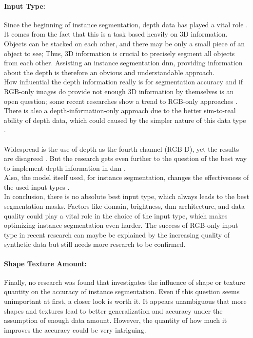 		\paragraph{Input Type:} Since the beginning of instance segmentation, depth data has played a vital role \cite{Silbermann2012}. It comes from the fact that this is a task based heavily on 3D information. Objects can be stacked on each other, and there may be only a small piece of an object to see;
		Thus, 3D information is crucial to precisely segment all objects from each other. Assisting an instance segmentation \ac{dnn}, providing information about the depth is therefore an obvious and understandable approach.\\
		How influential the depth information really is for segmentation accuracy and if RGB-only images do provide not enough 3D information by themselves is an open question; some recent researches show a trend to RGB-only approaches \cite{Raj2023}\cite{Zakeri2024}.\\
		There is also a depth-information-only approach due to the better sim-to-real ability of depth data, which could caused by the simpler nature of this data type \cite{Danielczuk2019}.\\\\
		Widespread is the use of depth as the fourth channel (RGB-D), yet the results are disagreed \cite{Lüling2021}\cite{Zakeri2024}.
		But the research gets even further to the question of the best way to implement depth information in \ac{dnn} \cite{Xiang2021}\cite{Xie2020}\cite{Pei2024}\cite{Yasir2022}\cite{Shao2018}\cite{Ye2017}.\\
		Also, the model itself used, for instance segmentation, changes the effectiveness of the used input types \cite{Xiang2021}.\\
		In conclusion, there is no absolute best input type, which always leads to the best segmentation masks. Factors like domain, brightness, \ac{dnn} architecture, and data quality could play a vital role in the choice of the input type, which makes optimizing instance segmentation even harder. The success of RGB-only input type in recent research \cite{Raj2023}\cite{Zakeri2024} can maybe be explained by the increasing quality of synthetic data but still needs more research to be confirmed.
		\paragraph{Shape Texture Amount:} Finally, no research was found that investigates the influence of shape or texture quantity on the accuracy of instance segmentation. Even if this question seems unimportant at first, a closer look is worth it. It appears unambiguous that more shapes and textures lead to better generalization and accuracy under the assumption of enough data amount. However, the quantity of how much it improves the accuracy could be very intriguing. 
		

